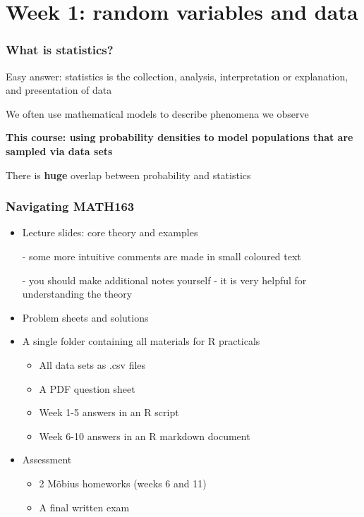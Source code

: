 \documentclass[t,8pt]{beamer}%
\begin{document}
\tableofcontents

	
	
	\section{Week 1: random variables and data}
	
	\begin{frame}
		\frametitle{What is statistics?}
		Easy answer: statistics is the collection, analysis, interpretation or explanation, and presentation of data \par
		We often use mathematical models to describe phenomena we observe \par
		{\bf This course: using probability densities to model populations that are sampled via data sets} \par
		There is {\bf huge} overlap between probability and statistics
	\end{frame}
	
	\begin{frame}
		\frametitle{Navigating MATH163}
		\begin{itemize}
			\item Lecture slides: core theory and examples \par 
			{\small\color{NavyBlue} - some more intuitive comments are made in small coloured text \par 
				- you should make additional notes yourself - it is very helpful for understanding the theory}
			\item Problem sheets and solutions
			\item A single folder containing all materials for R practicals \par 
			\begin{itemize}
				\item[-] All data sets as .csv files
				\item[-] A PDF question sheet
				\item[-] Week 1-5 answers in an R script
				\item[-] Week 6-10 answers in an R markdown document
			\end{itemize}
			\item Assessment
			\begin{itemize}
				\item[-] 2 M\"obius homeworks (weeks 6 and 11)
				\item[-] A final written exam
			\end{itemize}
		\end{itemize}
	\end{frame}
	
\end{document}
